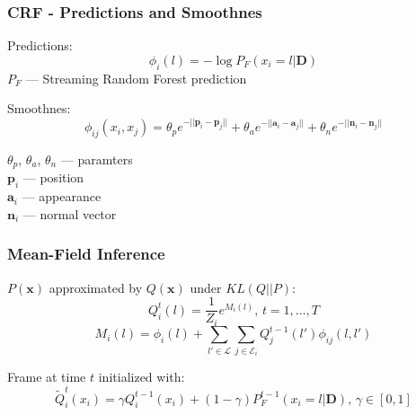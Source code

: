 \documentclass[mathserif, 10pt]{beamer}
\begin{document}
\begin{frame}
\frametitle{CRF - Predictions and Smoothnes}

  Predictions:
  \begin{equation}
  \phi_i(l) = -\log P_F(x_i = l | \mathbf{D})
  \end{equation}
  $P_F$ --- Streaming Random Forest prediction

  \vspace{0.5cm}
  Smoothnes:
  \begin{equation}
      \phi_{ij}(x_i, x_j)  = \theta_p e^{-||\mathbf{p}_i - \mathbf{p}_j||}  + \theta_a e^{-||\mathbf{a}_i - \mathbf{a}_j||} + \theta_n e^{-||\mathbf{n}_i - \mathbf{n}_j||}
  \end{equation}
  
  $\theta_p$, $\theta_a$, $\theta_n$ --- paramters \\
  $\mathbf{p}_i$ --- position\\
  $\mathbf{a}_i$ --- appearance\\
  $\mathbf{n}_i$ --- normal vector
  
\end{frame}

\begin{frame}
\frametitle{Mean-Field Inference}
$P(\mathbf{x})$ approximated by $Q(\mathbf{x})$ under $KL(Q||P)$:
\begin{equation}
 Q_i^t(l) = \frac{1}{Z_i}e^{M_i(l)} \text{, } t = 1, \ldots, T
\end{equation}
\begin{equation}
 M_i(l) = \phi_i(l) + \sum_{l' \in \mathcal{L}} \sum_{j \in \mathcal{E}_i} Q_j^{t-1}(l')\phi_{ij}(l, l')
\end{equation}


Frame at time $t$ initialized with:
\begin{equation}
 \widetilde{Q}_i^t(x_i) = \gamma Q_i^{t-1}(x_i) + (1 - \gamma) P_F^{t-1}(x_i = l | \mathbf{D}) \text{, } \gamma \in [0, 1]
\end{equation}

\end{frame}

\end{document}
